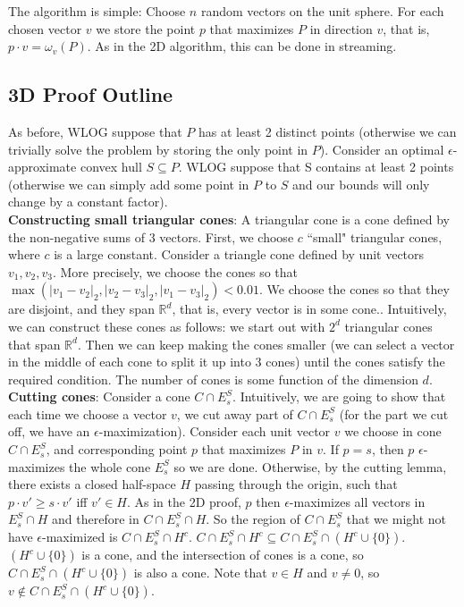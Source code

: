The algorithm is simple: Choose $n$ random vectors on the unit sphere. For each chosen vector $v$ we store the point $p$ that maximizes $P$ in direction $v$, that is, $p \cdot v = \omega_v(P)$. As in the 2D algorithm, this can be done in streaming.

\subsection{3D Proof Outline}

As before, WLOG suppose that $P$ has at least 2 distinct points (otherwise we can trivially solve the problem by storing the only point in $P$). Consider an optimal $\epsilon$-approximate convex hull $S \subseteq P$. WLOG suppose that S contains at least 2 points (otherwise we can simply add some point in $P$ to $S$ and our bounds will only change by a constant factor). 
\\

\textbf{Constructing small triangular cones}: A triangular cone is a cone defined by the non-negative sums of 3 vectors. First, we choose $c$ ``small" triangular cones, where $c$ is a large constant. Consider a triangle cone defined by unit vectors $v_1, v_2, v_3$. More precisely, we choose the cones so that $\max(|v_1 - v_2|_2, |v_2 - v_3|_2, |v_1 - v_3|_2) < 0.01$. We choose the cones so that they are disjoint, and they span $\mathbb{R}^d$, that is, every vector is in some cone.. Intuitively, we can construct these cones as follows: we start out with $2^d$ triangular cones that span $\mathbb{R}^d$. Then we can keep making the cones smaller (we can select a vector in the middle of each cone to split it up into 3 cones) until the cones satisfy the required condition. The number of cones is some function of the dimension $d$.
\\

\textbf{Cutting cones}: Consider a cone $C \cap E^S_s$. Intuitively, we are going to show that each time we choose a vector $v$, we cut away part of $C \cap E^S_s$ (for the part we cut off, we have an $\epsilon$-maximization). Consider each unit vector $v$ we choose in cone $C \cap E^S_s$, and corresponding point $p$ that maximizes $P$ in $v$. If $p = s$, then $p$ $\epsilon$-maximizes the whole cone $E^S_s$ so we are done. Otherwise, by the cutting lemma, there exists a closed half-space $H$ passing through the origin, such that $p \cdot v' \geq s \cdot v'$ iff $v' \in H$. As in the 2D proof, $p$ then $\epsilon$-maximizes all vectors in $E^S_s \cap H$ and therefore in $C \cap E^S_s \cap H$. So the region of $C \cap E^S_s$ that we might not have $\epsilon$-maximized is $C \cap E^S_s \cap H^c$. $C \cap E^S_s \cap H^c \subseteq C \cap E^S_s \cap (H^c \cup \{0\})$. $(H^c \cup \{0\})$ is a cone, and the intersection of cones is a cone, so  $C \cap E^S_s \cap (H^c \cup \{0\})$ is also a cone. Note that $v \in H$ and $v \neq 0$, so $v \not\in C \cap E^S_s \cap (H^c \cup \{0\})$.
\\

